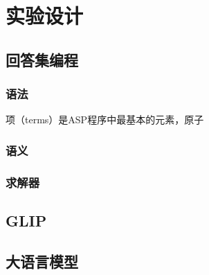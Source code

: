 \chapter{实验设计}
\section{回答集编程}
\subsection{语法}
项（terms）是ASP程序中最基本的元素，原子
\subsection{语义}
\subsection{求解器}
\section{GLIP}
\section{大语言模型}